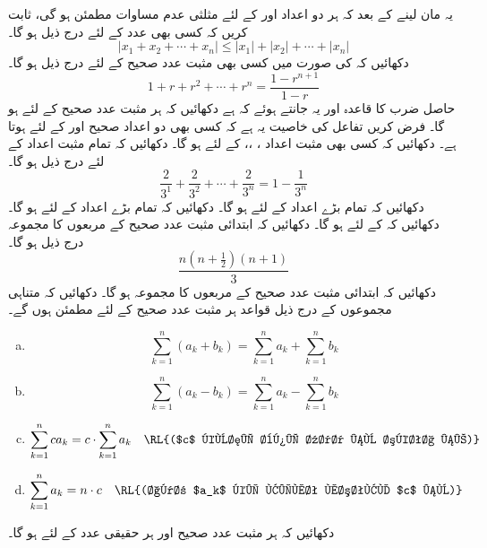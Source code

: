 \setcounter{questioncounter}{0}
یہ مان لینے کے بعد کہ  ہر دو اعداد  اور   کے لئے  مثلثی عدم مساوات مطمئن  ہو گی، ثابت کریں کہ کسی بھی عدد  کے لئے درج ذیل ہو گا۔
\[|x_1+x_2+\cdots+x_n| \le |x_1|+|x_2|+\cdots +|x_n|\]
دکھائیں کہ   کی صورت میں کسی بھی مثبت عدد صحیح  کے لئے درج ذیل ہو گا۔
\[1+r+r^2+\cdots+r^n=\frac{1-r^{n+1}}{1-r}\]
حاصل ضرب کا قاعدہ  اور  یہ جانتے ہوئے کہ  ہے دکھائیں کہ ہر مثبت عدد صحیح  کے لئے  ہو گا۔
فرض کریں   تفاعل  کی خاصیت یہ ہے کہ  کسی بھی دو  اعداد صحیح  اور  کے لئے   ہوتا ہے۔ دکھائیں کہ  کسی بھی  مثبت اعداد ، ،،  کے لئے  ہو گا۔
دکھائیں کہ تمام مثبت   اعداد  کے لئے درج ذیل ہو گا۔
\[\frac{2}{3^1}+\frac{2}{3^2}+\cdots+\frac{2}{3^n}=1-\frac{1}{3^n}\]
دکھائیں کہ تمام بڑے  اعداد  کے لئے  ہو گا۔
دکھائیں کہ تمام بڑے  اعداد  کے لئے  ہو گا۔
دکھائیں کہ  کے لئے  ہو گا۔
\quad 
دکھائیں کہ ابتدائی   مثبت عدد صحیح کے مربعوں کا مجموعہ درج ذیل ہو گا۔
\[\frac{n(n+\frac{1}{2})(n+1)}{3}\]
\quad 
دکھائیں کہ ابتدائی   مثبت عدد صحیح کے مربعوں کا مجموعہ   ہو گا۔
\quad
دکھائیں کہ متناہی مجموعوں کے  درج ذیل  قواعد ہر مثبت عدد صحیح  کے لئے مطمئن ہوں گے۔
\begin{enumerate}[a.]
\item
\[\sum_{k=1}^{n}(a_k+b_k)=\sum_{k=1}^{n}a_k+\sum_{k=1}^{n}b_k\]
\item
\[\sum_{k=1}^{n}(a_k-b_k)=\sum_{k=1}^{n}a_k-\sum_{k=1}^{n}b_k\]
\item
\[\sum_{k=1}^{n} ca_k=c\cdot \sum_{k=1}^{n} a_k \quad \text{\RL{($c$ کوئی بھی عدد ہو سکتا ہے)}}\]
\item
\[\sum_{k=1}^{n} a_k=n\cdot c\quad \text{\RL{(اگر $a_k$ کی قیمت مستقل $c$ ہو)}}\]
\end{enumerate}
دکھائیں کہ ہر مثبت عدد صحیح  اور ہر حقیقی عدد  کے لئے  ہو گا۔

